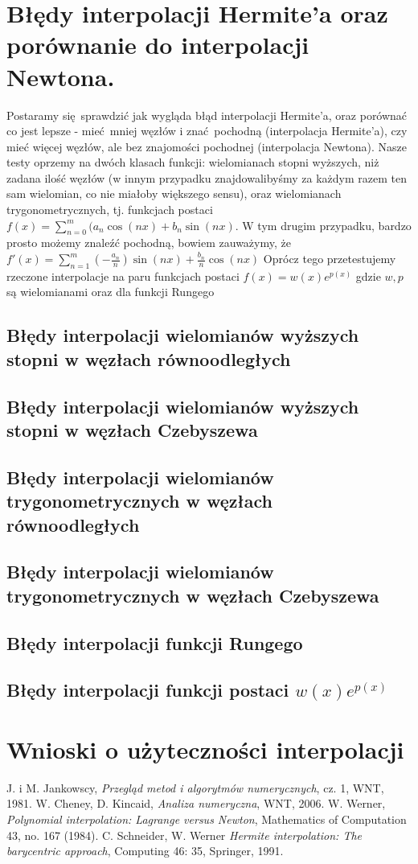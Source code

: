 \documentclass[10pt,wide]{mwart}
\theoremstyle{definition}
\begin{document}
\section{Błędy interpolacji Hermite'a oraz porównanie do interpolacji Newtona.}
Postaramy się sprawdzić jak wygląda błąd interpolacji Hermite'a, oraz porównać co jest lepsze -
mieć mniej węzłów i znać pochodną (interpolacja Hermite'a), czy mieć więcej węzłów, ale bez znajomości pochodnej (interpolacja Newtona).
Nasze testy oprzemy na dwóch klasach funkcji:
wielomianach stopni wyższych, niż zadana ilość węzłów
(w innym przypadku znajdowalibyśmy za każdym razem ten sam wielomian, co nie miałoby większego sensu),
oraz wielomianach trygonometrycznych, tj. funkcjach postaci \(f(x) = \sum_{n=0}^{m}(a_n\cos(nx) + b_n\sin(nx)\).
W tym drugim przypadku, bardzo prosto możemy znaleźć pochodną, bowiem zauważymy, że \(f'(x) = \sum_{n=1}^{m}(-\frac{a_n}{n})\sin(nx) + \frac{b_n}{n}\cos(nx)\)
Oprócz tego przetestujemy rzeczone interpolacje na paru funkcjach postaci \(f(x) = w(x)e^{p(x)}\) gdzie \(w,p\) są wielomianami oraz dla funkcji Rungego
\subsection{Błędy interpolacji wielomianów wyższych stopni w węzłach równoodległych}
\subsection{Błędy interpolacji wielomianów wyższych stopni w węzłach Czebyszewa}
\subsection{Błędy interpolacji wielomianów trygonometrycznych w węzłach równoodległych}
\subsection{Błędy interpolacji wielomianów trygonometrycznych w węzłach Czebyszewa}
\subsection{Błędy interpolacji funkcji Rungego}
\subsection{Błędy interpolacji funkcji postaci \(w(x)e^{p(x)}\)}

\section{Wnioski o użyteczności interpolacji }


\begin{thebibliography}{9}
\itemsep10pt
 J. i M. Jankowscy, \emph{Przegląd metod i algorytmów numerycznych}, cz. 1, WNT, 1981.
 W. Cheney, D. Kincaid, \emph{Analiza numeryczna}, WNT, 2006.
 W. Werner, \emph{Polynomial interpolation: Lagrange versus Newton}, Mathematics of Computation 43, no. 167 (1984).
 C. Schneider, W. Werner \emph{Hermite interpolation: The barycentric approach}, Computing 46: 35, Springer, 1991.
\end{thebibliography}
\end{document}
